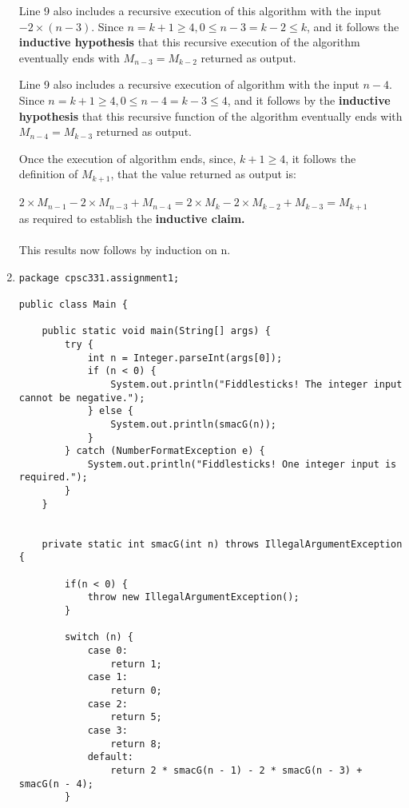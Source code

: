 \documentclass{article}
\begin{document}
\begin{enumerate}
    Line 9 also includes a recursive execution of this algorithm with the input $-2 \times (n-3)$. Since $n = k+1 \geq 4, 0 \leq n-3 = k-2 \leq k$, and it follows the \textbf{inductive hypothesis} that this recursive execution of the algorithm eventually ends with $M_{n-3} = M_{k-2}$ returned as output.
    
    Line 9 also includes a recursive execution of algorithm with the input $n-4$. Since $n = k+1 \geq 4, 0 \leq n-4 = k-3 \leq 4$, and it follows by the \textbf{inductive hypothesis} that this recursive function of the algorithm eventually ends with $M_{n-4} = M_{k-3}$ returned as output.
    
    Once the execution of algorithm ends, since, $k+1 \geq 4$, it follows the definition of $M_{k+1}$, that the value returned as output is: \\ \\
    $2 \times M_{n-1} - 2 \times M_{n-3} + M_{n-4} = 2 \times M_{k} -2 \times M_{k-2} + M_{k-3} = M_{k+1}$ \\ 
    
    as required to establish the \textbf{inductive claim.} \\ \\
    This results now follows by induction on n.
    
    \item 
    
    \begin{verbatim}
package cpsc331.assignment1;

public class Main {

    public static void main(String[] args) {
        try {
            int n = Integer.parseInt(args[0]);
            if (n < 0) {
                System.out.println("Fiddlesticks! The integer input cannot be negative.");
            } else {
                System.out.println(smacG(n));
            }
        } catch (NumberFormatException e) {
            System.out.println("Fiddlesticks! One integer input is required.");
        }
    }


    private static int smacG(int n) throws IllegalArgumentException {

        if(n < 0) {
            throw new IllegalArgumentException();
        }

        switch (n) {
            case 0:
                return 1;
            case 1:
                return 0;
            case 2:
                return 5;
            case 3:
                return 8;
            default:
                return 2 * smacG(n - 1) - 2 * smacG(n - 3) + smacG(n - 4);
        }



\end{verbatim}
\end{enumerate}
\end{document}

